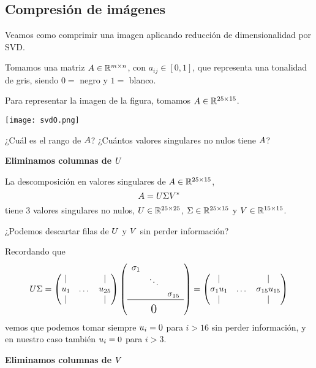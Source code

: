 \subsection{Compresión de imágenes}

Veamos como comprimir una imagen aplicando reducción de dimensionalidad por SVD.

Tomamos una matriz $\Ab \in \R^{m \times n}$, con $a_{ij} \in [0,1]$, que representa una tonalidad de gris, siendo $0 = $ negro y $1 = $ blanco.

\begin{ejemplo}
Para representar la imagen de la figura, tomamos $\Ab \in \R^{25 \times 15}$.

\begin{center}
\texttt{[image: svdO.png]}
\end{center}

¿Cuál es el rango de $\Ab$? ¿Cuántos valores singulares no nulos tiene $\Ab$?

\textbf{Eliminamos columnas de $\Ub$}

La descomposición en valores singulares de  $\Ab \in \R^{25 \times 15}$,
$$
\Ab = \Ub \Sigmab \Vb^*
$$
tiene 3 valores singulares no nulos, $\Ub \in \R^{25 \times 25}$, $\Sigmab \in \R^{25 \times 15}$ y $\Vb \in \R^{15 \times 15}$.

¿Podemos descartar filas de $\Ub$ y $\Vb$ sin perder información?

Recordando que
$$
\Ub \Sigmab =  \begin{pmatrix} \vert & & \vert \\ \ub_1 & \dots & \ub_{25} \\ \vert & & \vert \end{pmatrix}
\left(\begin{array}{ccc}\sigma_1 & & \\ & \ddots & \\ & &  \sigma_{15}\\\hline         & \rule{0cm}{15pt} \text{\Large 0} &
 \end{array}\right) = \begin{pmatrix} \vert & & \vert \\ \sigma_1 \ub_1 & \dots & \sigma_{15} \ub_{15} \\ \vert & & \vert \end{pmatrix}
$$
vemos que podemos tomar siempre $\ub_i = \cero$ para $i > 16$ sin perder información, y en nuestro caso también $\ub_i = \cero$ para $i > 3$.

\textbf{Eliminamos columnas de $\Vb$}


\end{ejemplo}
